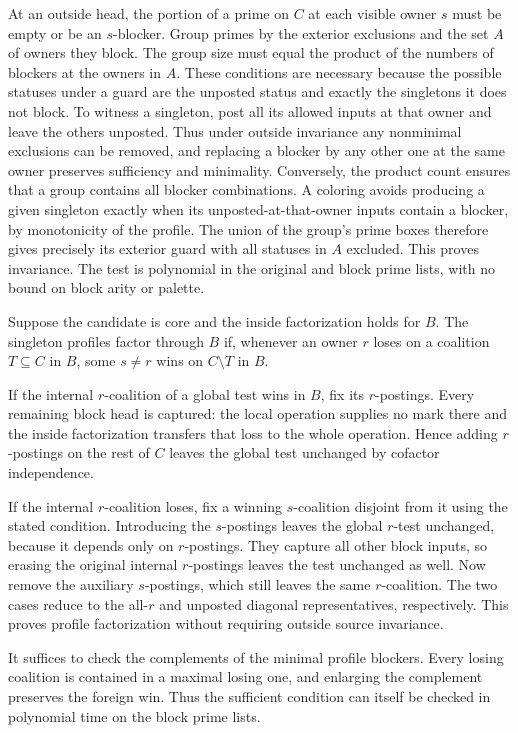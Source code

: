 At an outside head, the portion of a prime on
$C$ at each visible owner $s$ must be empty or be
an $s$-blocker. Group primes by the exterior
exclusions and the set $A$ of owners they block.
The group size must equal the product of the
numbers of blockers at the owners in $A$.
These conditions are necessary because the possible
statuses under a guard are the unposted status
and exactly the singletons it does not block.
To witness a singleton, post all its allowed inputs
at that owner and leave the others unposted. Thus
under outside invariance any nonminimal exclusions
can be removed, and replacing a blocker by any
other one at the same owner preserves sufficiency
and minimality. Conversely, the product count
ensures that a group contains all blocker
combinations. A coloring avoids producing a given
singleton exactly when its unposted-at-that-owner
inputs contain a blocker, by monotonicity of the
profile. The union of the group's prime boxes
therefore gives precisely its exterior guard with
all statuses in $A$ excluded. This proves invariance.
The test is polynomial in the original and block
prime lists, with no bound on block arity or palette.

Suppose the candidate is core and the inside
factorization holds for $B$. The singleton profiles
factor through $B$ if, whenever an owner $r$ loses
on a coalition $T\subseteq C$ in $B$, some $s\ne r$
wins on $C\setminus T$ in $B$.

If the internal $r$-coalition of a global test wins
in $B$, fix its $r$-postings. Every remaining block
head is captured: the local operation supplies no
mark there and the inside factorization transfers
that loss to the whole operation. Hence adding
$r$-postings on the rest of $C$ leaves the global
test unchanged by cofactor independence.

If the internal $r$-coalition loses, fix a winning
$s$-coalition disjoint from it using the stated
condition. Introducing the $s$-postings leaves the
global $r$-test unchanged, because it depends only
on $r$-postings. They capture all other block inputs,
so erasing the original internal $r$-postings leaves
the test unchanged as well. Now remove the auxiliary
$s$-postings, which still leaves the same $r$-coalition.
The two cases reduce to the all-$r$ and unposted
diagonal representatives, respectively. This proves
profile factorization without requiring outside source
invariance.

It suffices to check the complements of the minimal
profile blockers. Every losing coalition is contained
in a maximal losing one, and enlarging the complement
preserves the foreign win. Thus the sufficient condition
can itself be checked in polynomial time on the block
prime lists.


